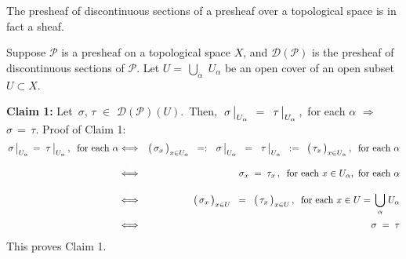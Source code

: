
\vskip 0.5cm
\begin{proposition}
\mbox{}\vskip 0.1cm
\noindent
The presheaf of discontinuous sections of a presheaf over a topological space is in fact a sheaf.
\end{proposition}
\proof
\vskip 0.3cm
\noindent
Suppose $\mathscr{P}$ is a presheaf on a topological space $X$, and
$\mathscr{D}(\mathscr{P})$ is the presheaf of discontinuous sections of $\mathscr{P}$.
\vskip 0.3cm
\noindent
Let $U = \,\underset{\alpha}{\bigcup}\;U_{\alpha}$ be an open cover of an open subset $U \subset X$.

\vskip 0.5cm
\noindent
\textbf{Claim 1:}\quad
Let \,$\sigma$, $\tau$ $\in$ $\mathscr{D}(\mathscr{P})(U)$.
\,\;Then,
\,$\left.\overset{{\color{white}.}}{\sigma}\,\right\vert_{U_{\alpha}}$
$=$
$\left.\overset{{\color{white}.}}{\tau}\,\right\vert_{U_{\alpha}}$\,,\,
for each $\alpha$
\;\;$\Longrightarrow$\;\;
$\sigma \,=\, \tau$.
\vskip 0.2cm
\noindent
Proof of Claim 1:
\begin{eqnarray*}
	\left.\overset{{\color{white}.}}{\sigma}\,\right\vert_{U_{\alpha}}
	\, = \,
	\left.\overset{{\color{white}.}}{\tau}\,\right\vert_{U_{\alpha}},
	\;\;\textnormal{for each $\alpha$}
& \Longleftrightarrow &
	\left(\,\overset{{\color{white}.}}{\sigma_{x}}\,\right)_{x \in U_{\alpha}}
	\;\; =: \;\;
	\left.\overset{{\color{white}.}}{\sigma}\,\right\vert_{U_{\alpha}}
	\;\; = \;\;
	\left.\overset{{\color{white}.}}{\tau}\,\right\vert_{U_{\alpha}}
	\;\; := \;\;
	\left(\,\overset{{\color{white}.}}{\tau_{x}}\,\right)_{x \in U_{\alpha}},
	\;\;\textnormal{for each $\alpha$}
\\
& \overset{{\color{white}\textnormal{\LARGE$1$}}}{\Longleftrightarrow} &
	\sigma_{x} \; = \; \tau_{x}\,,
	\;\;\textnormal{for each $x \in U_{\alpha}$,\, for each $\alpha$}
\\
& \overset{{\color{white}\textnormal{\LARGE$1$}}}{\Longleftrightarrow} &
	\left(\,\overset{{\color{white}.}}{\sigma_{x}}\,\right)_{x \in U}
	\;\; = \;\;
	\left(\,\overset{{\color{white}.}}{\tau_{x}}\,\right)_{x \in U},
	\;\;\textnormal{for each $x \in U = \,\underset{\alpha}{\bigcup}\;U_{\alpha}$}
\\
& \overset{{\color{white}\textnormal{\tiny$1$}}}{\Longleftrightarrow} &
	\sigma \; = \; \tau
\end{eqnarray*}
This proves Claim 1.


